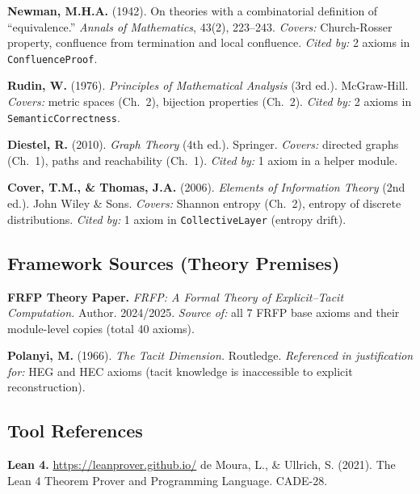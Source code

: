 \medskip

\noindent\textbf{Newman, M.H.A.} (1942).
On theories with a combinatorial definition of ``equivalence.''
\textit{Annals of Mathematics}, 43(2), 223--243.
\textit{Covers:} Church-Rosser property, confluence from termination and local confluence.
\textit{Cited by:} 2 axioms in \texttt{ConfluenceProof}.

\medskip

\noindent\textbf{Rudin, W.} (1976).
\textit{Principles of Mathematical Analysis} (3rd ed.).
McGraw-Hill.
\textit{Covers:} metric spaces (Ch.~2), bijection properties (Ch.~2).
\textit{Cited by:} 2 axioms in \texttt{SemanticCorrectness}.

\medskip

\noindent\textbf{Diestel, R.} (2010).
\textit{Graph Theory} (4th ed.).
Springer.
\textit{Covers:} directed graphs (Ch.~1), paths and reachability (Ch.~1).
\textit{Cited by:} 1 axiom in a helper module.

\medskip

\noindent\textbf{Cover, T.M., \& Thomas, J.A.} (2006).
\textit{Elements of Information Theory} (2nd ed.).
John Wiley \& Sons.
\textit{Covers:} Shannon entropy (Ch.~2), entropy of discrete distributions.
\textit{Cited by:} 1 axiom in \texttt{CollectiveLayer} (entropy drift).

\subsection*{Framework Sources (Theory Premises)}

\noindent\textbf{FRFP Theory Paper.}
\textit{FRFP: A Formal Theory of Explicit--Tacit Computation.}
Author. 2024/2025.
\textit{Source of:} all 7 FRFP base axioms and their module-level copies (total 40 axioms).

\medskip

\noindent\textbf{Polanyi, M.} (1966).
\textit{The Tacit Dimension.}
Routledge.
\textit{Referenced in justification for:} HEG and HEC axioms (tacit knowledge is
inaccessible to explicit reconstruction).

\subsection*{Tool References}

\noindent\textbf{Lean 4.}
\url{https://leanprover.github.io/}
de Moura, L., \& Ullrich, S. (2021). The Lean 4 Theorem Prover and Programming Language.
CADE-28.

